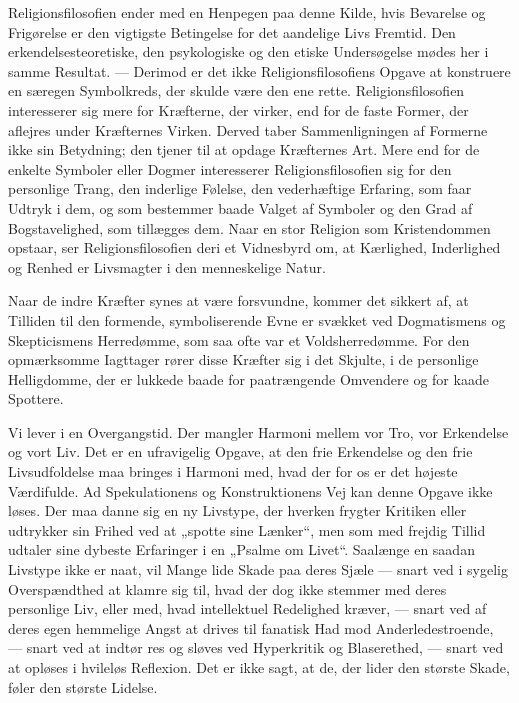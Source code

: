 \documentclass[12pt,a4paper,openany]{book}
\newcommand{\opage}[1]{\marginnote{\footnotesize\textit{[#1]}}}
\begin{document}
Religionsfilosofien ender med en Henpegen paa denne Kilde, hvis
Bevarelse og Frigørelse er den vigtigste Betingelse for det aandelige
Livs Fremtid. Den erkendelsesteoretiske, den psykologiske og den etiske
Undersøgelse mødes her i samme Resultat. --- Derimod er det ikke
Religionsfilosofiens Opgave at konstruere en særegen Symbolkreds, der
skulde være den ene rette. Religionsfilosofien interesserer sig mere for
Kræfterne, der virker, end for de faste Former, der aflejres under
Kræfternes Virken. Derved taber Sammenligningen af Formerne ikke sin
Betydning; den tjener til at opdage Kræfternes Art. Mere end for de
enkelte Symboler eller Dogmer interesserer Religionsfilosofien sig for
den personlige Trang, den inderlige Følelse, den vederhæftige Erfaring,
som faar Udtryk i dem, og som bestemmer baade Valget af Symboler og den
Grad af Bogstavelighed, som tillægges dem. Naar en stor Religion som
Kristendommen opstaar, ser Religionsfilosofien deri et Vidnesbyrd om, at
Kærlighed, Inderlighed og Renhed er Livsmagter i den menneskelige Natur.

Naar de indre Kræfter synes at være forsvundne, kommer det sikkert af,
at Tilliden til den formende, symboliserende Evne er svækket ved
Dogmatismens og Skepticismens Herredømme, som saa ofte var et
Voldsherredømme. For den opmærksomme Iagttager rører disse Kræfter sig i
det Skjulte, i de personlige Helligdomme, der er lukkede baade for
paatrængende Omvendere og for kaade Spottere.

Vi lever i en Overgangstid. Der mangler Harmoni mellem vor Tro, vor
Erkendelse og vort Liv. Det er en ufravigelig Opgave, at den frie
Erkendelse og den frie Livsudfoldelse maa bringes i Harmoni med, hvad
der for os er det højeste Værdifulde. Ad Spekulationens og
Konstruktionens Vej kan denne Opgave ikke løses. Der maa danne sig en ny
Livstype, der hverken frygter Kritiken eller udtrykker sin Frihed ved at
„spotte sine Lænker“, men som med frejdig Tillid udtaler sine dybeste
Erfaringer i en „Psalme om Livet“. Saalænge en saadan Livstype ikke er
naat, vil Mange lide Skade paa deres Sjæle --- snart ved i sygelig
Overspændthed at klamre sig til, hvad der dog ikke stemmer med deres
personlige Liv, eller med, hvad intellektuel Redelighed kræver, ---
snart ved af deres egen hemmelige Angst at drives til fanatisk Had mod
Anderledestroende, --- snart ved at indtør%
\opage{242}res og sløves ved Hyperkritik og Blaserethed, --- snart ved
at opløses i hvileløs Reflexion. Det er ikke sagt, at de, der lider den
største Skade, føler den største Lidelse.
\end{document}
